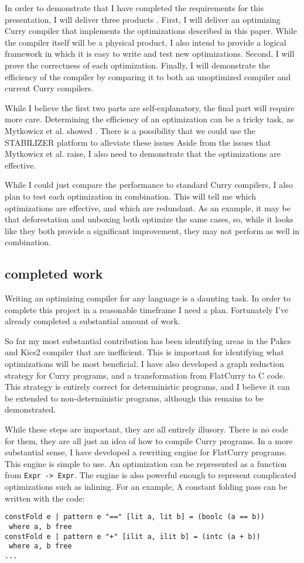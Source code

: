 
In order to demonstrate that I have completed the requirements for this presentation,
I will deliver three products .
First, I will deliver an optimizing Curry compiler 
that implements the optimizations described in this paper.
While the compiler itself will be a physical product, I also intend to provide a logical framework
in which it is easy to write and test new optimizations.
Second, I will prove the correctness of each optimization.
Finally, I will demonstrate the efficiency of the compiler 
by comparing it to both an unoptimized compiler
and current Curry compilers.

While I believe the first two parts are self-explanatory, the final part will require more care.
Determining the efficiency of an optimization can be a tricky task,
as Mytkowicz et al. showed \cite{wrongData}.
There is a possibility that we could use the STABILIZER
platform \cite{STABILIZER} to alleviate these issues
Aside from the issues that Mytkowicz et al. raise,
I also need to demonstrate that the optimizations are effective.

While I could just compare the performance to standard Curry compilers,
I also plan to test each optimization in combination.
This will tell me which optimizations are effective, and which are redundant.
As an example, it may be that deforestation and unboxing both optimize the same cases,
so, while it looks like they both provide a significant improvement,
they may not perform as well in combination.

\subsection{completed work}

Writing an optimizing compiler for any language is a daunting task.
In order to complete this project in a reasonable timeframe I need a plan.
Fortunately I've already completed a substantial amount of work.

So far my most substantial contribution has been identifying
areas in the Pakcs and Kics2 compiler that are inefficient.
This is important for identifying what optimizations will be most beneficial.
I have also developed a graph reduction strategy for Curry programs,
and a transformation from FlatCurry to C code.
This strategy is entirely correct for deterministic programs,
and I believe it can be extended to non-deterministic programs, although this remains to be demonstrated.

While these steps are important, they are all entirely illusory.
There is no code for them, they are all just an idea of how to compile Curry programs.
In a more substantial sense, I have developed a rewriting engine for FlatCurry programs.
This engine is simple to use.  An optimization can be represented as a function from \texttt{Expr -> Expr}.
The engine is also powerful enough to represent complicated optimizations such as inlining.
For an example, A constant folding pass can be written with the code:
\begin{verbatim}
constFold e | pattern e "==" [lit a, lit b] = (boolc (a == b))
 where a, b free
constFold e | pattern e "+" [ilit a, ilit b] = (intc (a + b))
 where a, b free
...
\end{verbatim}


